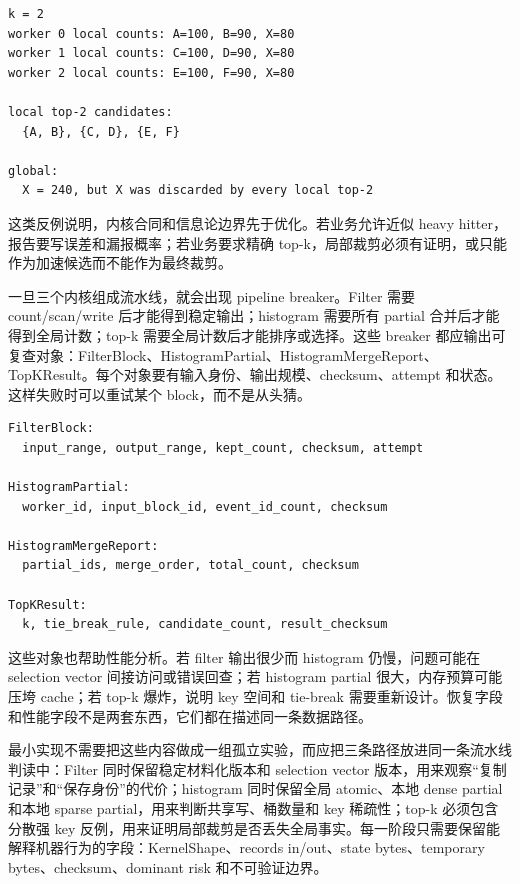 \begin{lstlisting}[numbers=none,caption={分散强 key 反例}]
k = 2
worker 0 local counts: A=100, B=90, X=80
worker 1 local counts: C=100, D=90, X=80
worker 2 local counts: E=100, F=90, X=80

local top-2 candidates:
  {A, B}, {C, D}, {E, F}

global:
  X = 240, but X was discarded by every local top-2
\end{lstlisting}

这类反例说明，内核合同和信息论边界先于优化。若业务允许近似 heavy hitter，报告要写误差和漏报概率；若业务要求精确 top-k，局部裁剪必须有证明，或只能作为加速候选而不能作为最终裁剪。

一旦三个内核组成流水线，就会出现 pipeline breaker。Filter 需要 count/scan/write 后才能得到稳定输出；histogram 需要所有 partial 合并后才能得到全局计数；top-k 需要全局计数后才能排序或选择。这些 breaker 都应输出可复查对象：FilterBlock、HistogramPartial、HistogramMergeReport、TopKResult。每个对象要有输入身份、输出规模、checksum、attempt 和状态。这样失败时可以重试某个 block，而不是从头猜。

\begin{lstlisting}[numbers=none,caption={三阶段流水线的恢复对象}]
FilterBlock:
  input_range, output_range, kept_count, checksum, attempt

HistogramPartial:
  worker_id, input_block_id, event_id_count, checksum

HistogramMergeReport:
  partial_ids, merge_order, total_count, checksum

TopKResult:
  k, tie_break_rule, candidate_count, result_checksum
\end{lstlisting}

这些对象也帮助性能分析。若 filter 输出很少而 histogram 仍慢，问题可能在 selection vector 间接访问或错误回查；若 histogram partial 很大，内存预算可能压垮 cache；若 top-k  爆炸，说明 key 空间和 tie-break 需要重新设计。恢复字段和性能字段不是两套东西，它们都在描述同一条数据路径。

最小实现不需要把这些内容做成一组孤立实验，而应把三条路径放进同一条流水线判读中：Filter 同时保留稳定材料化版本和 selection vector 版本，用来观察“复制记录”和“保存身份”的代价；histogram 同时保留全局 atomic、本地 dense partial 和本地 sparse partial，用来判断共享写、桶数量和 key 稀疏性；top-k 必须包含分散强 key 反例，用来证明局部裁剪是否丢失全局事实。每一阶段只需要保留能解释机器行为的字段：KernelShape、records in/out、state bytes、temporary bytes、checksum、dominant risk 和不可验证边界。

